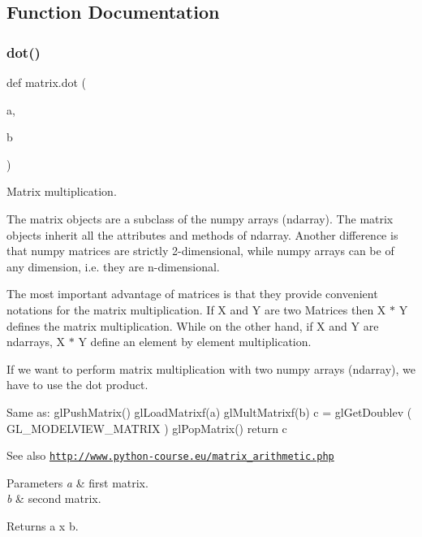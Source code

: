 \subsection{Function Documentation}
\mbox{\label{namespacematrix_a4023520a6d24b4de107acd3c284db948}} 
\subsubsection{\texorpdfstring{dot()}{dot()}}
{\footnotesize\ttfamily def matrix.\+dot (\begin{DoxyParamCaption}\item[{}]{a,  }\item[{}]{b }\end{DoxyParamCaption})}



Matrix multiplication. 

The matrix objects are a subclass of the numpy arrays (ndarray). The matrix objects inherit all the attributes and methods of ndarray. Another difference is that numpy matrices are strictly 2-\/dimensional, while numpy arrays can be of any dimension, i.\+e. they are n-\/dimensional.

The most important advantage of matrices is that they provide convenient notations for the matrix multiplication. If X and Y are two Matrices then X $\ast$ Y defines the matrix multiplication. While on the other hand, if X and Y are ndarrays, X $\ast$ Y define an element by element multiplication.

If we want to perform matrix multiplication with two numpy arrays (ndarray), we have to use the dot product.

Same as\+: gl\+Push\+Matrix() gl\+Load\+Matrixf(a) gl\+Mult\+Matrixf(b) c = gl\+Get\+Doublev ( G\+L\+\_\+\+M\+O\+D\+E\+L\+V\+I\+E\+W\+\_\+\+M\+A\+T\+R\+IX ) gl\+Pop\+Matrix() return c

\begin{DoxySeeAlso}{See also}
\href{http://www.python-course.eu/matrix_arithmetic.php}{\tt http\+://www.\+python-\/course.\+eu/matrix\+\_\+arithmetic.\+php} 
\end{DoxySeeAlso}

\begin{DoxyParams}{Parameters}
{\em a} & first matrix. \\
\hline
{\em b} & second matrix. \\
\hline
\end{DoxyParams}
\begin{DoxyReturn}{Returns}
a x b. 
\end{DoxyReturn}


